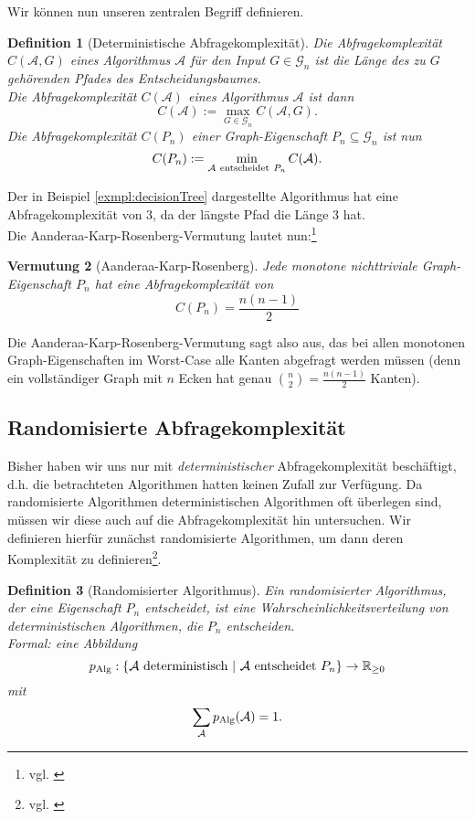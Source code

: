 \documentclass[10pt,a4paper, footheight=1mm, bibliography=totoc]{scrreprt}
\newtheorem{definition}{Definition}
\newtheorem{conjecture}[definition]{Vermutung}
\theoremstyle{definition}
\begin{document}
Wir können nun unseren zentralen Begriff definieren.

\begin{definition}[Deterministische Abfragekomplexität]
Die \emph{Abfragekomplexität} $C(\mathcal{A},G)$ eines
Algorithmus $\mathcal{A}$ für den Input $G\in \mathcal{G}_n$ ist
die Länge des zu $G$ gehörenden Pfades des
Entscheidungsbaumes. \\
Die \emph{Abfragekomplexität} $C(\mathcal{A})$ eines
Algorithmus $\mathcal{A}$ ist dann
$$ C(\mathcal{A}) := \max_{G \in \mathcal{G}_n} C(\mathcal{A},G).$$
Die \emph{Abfragekomplexität} $C(P_n)$ einer Graph-Eigenschaft
$P_n\subseteq \mathcal{G}_n$ ist nun
$$ C(P_n) := \min_{\mathcal{A} \ {\rm entscheidet}\  P_n} C(\mathcal{A}).$$
\end{definition}

Der in Beispiel \ref{exmpl:decisionTree} dargestellte
Algorithmus hat eine Abfragekomplexität von $3$, da
der längste Pfad die Länge $3$ hat. \\
Die Aanderaa-Karp-Rosenberg-Vermutung lautet nun:\footnote{vgl. \cite[S.9]{Lovasz}}
\begin{conjecture}[Aanderaa-Karp-Rosenberg]
Jede monotone nichttriviale Graph-Eigenschaft $P_n$
hat eine Abfragekomplexität von
$$C(P_n) = \frac{n(n-1)}{2}$$
\end{conjecture}
Die Aanderaa-Karp-Rosenberg-Vermutung sagt also aus,
das bei allen monotonen Graph-Eigenschaften im Worst-Case
alle Kanten abgefragt werden müssen (denn ein vollständiger Graph mit
$n$ Ecken hat genau ${\binom{n}{2}=\frac{n(n-1)}{2}}$ Kanten).

\subsection{Randomisierte Abfragekomplexität}

Bisher haben wir uns nur mit \emph{deterministischer}
Abfragekomplexität beschäftigt, d.h. die betrachteten
Algorithmen hatten keinen Zufall zur Verfügung.
Da randomisierte Algorithmen deterministischen Algorithmen
oft überlegen sind, müssen wir diese auch auf
die Abfragekomplexität hin untersuchen.
Wir definieren hierfür zunächst randomisierte Algorithmen,
um dann deren Komplexität zu definieren\footnote{vgl.
\cite[S.120]{Groeger}}.
\begin{definition}[Randomisierter Algorithmus]
Ein \emph{randomisierter Algorithmus}, der eine
Eigenschaft $P_n$ entscheidet, ist eine
Wahrscheinlichkeitsverteilung von deterministischen
Algorithmen, die $P_n$ entscheiden. \\
Formal: eine Abbildung
$$ p_\textup{Alg}: \{ \mathcal{A} \ \textup{deterministisch} \ | \
         \mathcal{A} \ {\rm entscheidet} \ P_n \} \to \mathbb{R}_{\geq 0} $$
mit 
$$\sum_\mathcal{A} p_\textup{Alg}(\mathcal{A}) = 1.$$
\end{definition}
\end{document}
